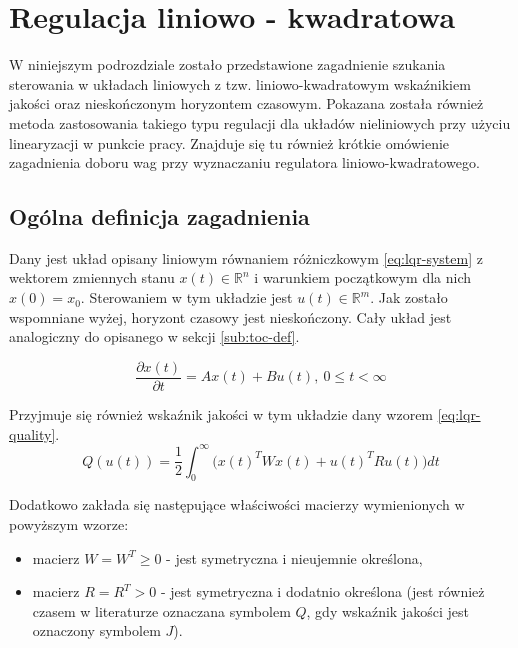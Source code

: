 \section{Regulacja liniowo - kwadratowa}
\label{sec:lqr}

W niniejszym podrozdziale zostało przedstawione zagadnienie szukania sterowania w układach liniowych z tzw. liniowo-kwadratowym wskaźnikiem jakości oraz nieskończonym horyzontem czasowym. Pokazana została również metoda zastosowania takiego typu regulacji dla układów nieliniowych przy użyciu linearyzacji w punkcie pracy. Znajduje się tu również krótkie omówienie zagadnienia doboru wag przy wyznaczaniu regulatora liniowo-kwadratowego.

\subsection{Ogólna definicja zagadnienia}
\label{sub:lqr-def}

Dany jest układ opisany liniowym równaniem różniczkowym \ref{eq:lqr-system} z wektorem zmiennych stanu $x(t) \in \mathbb{R}^{n}$ i warunkiem początkowym dla nich $x(0) = x_{0}$. Sterowaniem w tym układzie jest $u(t) \in \mathbb{R}^{m}$. Jak zostało wspomniane wyżej, horyzont czasowy jest nieskończony. Cały układ jest analogiczny do opisanego w sekcji \ref{sub:toc-def}.

\begin{equation}\label{eq:lqr-system}
\frac{\partial x(t)}{\partial t} = Ax(t) + Bu(t),~ 0 \leq t < \infty
\end{equation}

Przyjmuje się również wskaźnik jakości w tym układzie dany wzorem \ref{eq:lqr-quality}.
\begin{equation}\label{eq:lqr-quality}
Q(u(t)) = \frac{1}{2}\int_{0}^{\infty} \Big(x(t)^{T}Wx(t) + u(t)^{T}Ru(t)\Big)dt
\end{equation}

Dodatkowo zakłada się następujące właściwości macierzy wymienionych w powyższym wzorze:
\begin{itemize}
    \item macierz $W = W^{T} \geq 0$ - jest symetryczna i nieujemnie określona,
    \item macierz $R = R^{T} > 0$ - jest symetryczna i dodatnio określona (jest również czasem w literaturze oznaczana symbolem $Q$, gdy wskaźnik jakości jest oznaczony symbolem $J$).
\end{itemize}

